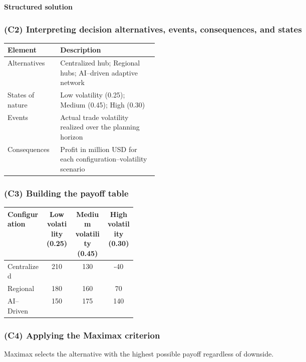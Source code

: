 \textbf{Structured solution}

\subsubsection{(C2) Interpreting decision alternatives, events, consequences, and states}\label{subsubsec:practice-activity-1-solution-3-c2}

\begin{center}
	\begin{tabularx}{\linewidth}{@{}L{0.35\linewidth}Y@{}}
		\toprule
		Element & Description \\
		\midrule
		Alternatives & Centralized hub; Regional hubs; AI--driven adaptive network \\
		States of nature & Low volatility (0.25); Medium (0.45); High (0.30) \\
		Events & Actual trade volatility realized over the planning horizon \\
		Consequences & Profit in million USD for each configuration--volatility scenario \\
		\bottomrule
	\end{tabularx}
\end{center}

\subsubsection{(C3) Building the payoff table}\label{subsubsec:practice-activity-1-solution-3-c3}

\begin{center}
	\begin{tabularx}{\linewidth}{@{}L{0.3\linewidth}C C C@{}}
		\toprule
		Configuration & Low volatility (0.25) & Medium volatility (0.45) & High volatility (0.30) \\
		\midrule
		Centralized & 210 & 130 & -40 \\
		Regional & 180 & 160 & 70 \\
		AI--Driven & 150 & 175 & 140 \\
		\bottomrule
	\end{tabularx}
\end{center}

\subsubsection{(C4) Applying the Maximax criterion}\label{subsubsec:practice-activity-1-solution-3-c4}

Maximax selects the alternative with the highest possible payoff regardless of downside.

